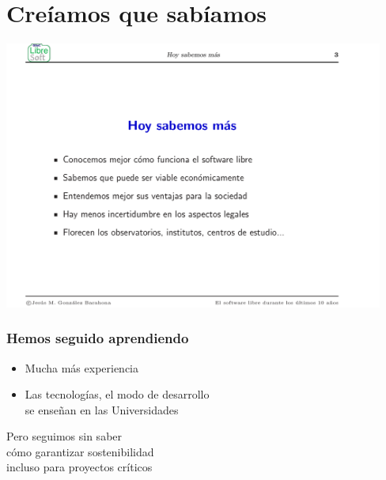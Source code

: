 \documentclass[17pt,aspectratio=169]{beamer}
\begin{document}
\section{Creíamos que sabíamos}

\begin{frame}

\begin{center}
  \includegraphics[width=12.5cm]{figs/transpas-04}
\end{center}  

\end{frame}

\begin{frame}
\frametitle{Hemos seguido aprendiendo}

\begin{itemize}
\item Mucha más experiencia
\item Las tecnologías, el modo de desarrollo \\
  se enseñan en las Universidades \\
\end{itemize} 

\begin{center}
  Pero seguimos sin saber \\
  cómo garantizar sostenibilidad \\
  incluso para proyectos críticos \\
\end{center}

\end{frame}
\end{document}
